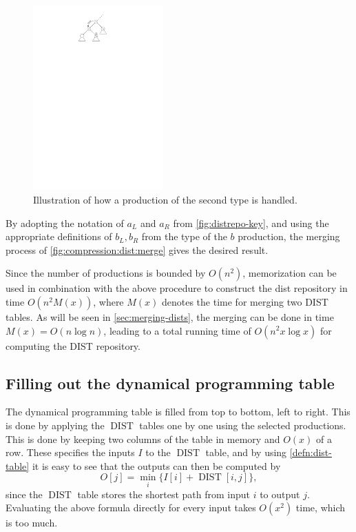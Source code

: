 \documentclass[twoside,11pt,openright]{report}
\newcommand{\DIST}{\operatorname{DIST}}
\begin{document}
\begin{description}
  \begin{figure}[h!]
    \centering
    \includegraphics[width=5cm]{images/distrepo-2nd}
    \caption{Illustration of how a production of the second type is handled.}
    \label{fig:distrepo-2nd}
  \end{figure}

  By adopting the notation of $a_L$ and $a_R$ from \cref{fig:distrepo-key}, and using the appropriate definitions of $b_L, b_R$ from the type of the $b$ production, the merging process of \cref{fig:compression:dist:merge} gives the desired result.
\end{description}
Since the number of productions is bounded by $O(n^2)$, memorization can be used in combination with the above procedure to construct the dist repository in time $O(n^2 M(x))$, where $M(x)$ denotes the time for merging two DIST tables. As will be seen in \cref{sec:merging-dists}, the merging can be done in time $M(x) = O(n\log{n})$, leading to a total running time of $O(n^2x\log{x})$ for computing the DIST repository.

\subsection{Filling out the dynamical programming table}
\label{sec:algorithm:filling-grid-overview}
The dynamical programming table is filled from top to bottom, left to right. This is done by applying the $\DIST$ tables one by one using the selected productions. This is done by keeping two columns of the table in memory and $O(x)$ of a row. These specifies the inputs $I$ to the $\DIST$ table, and by using \cref{defn:dist-table} it is easy to see that the outputs can then be computed by
\begin{equation}
  \label{eqn:dist-application}
  O[j] = \min_i \{ I[i] + \DIST[i, j] \},
\end{equation}
since the $\DIST$ table stores the shortest path from input $i$ to output $j$. Evaluating the above formula directly for every input takes $O(x^2)$ time, which is too much.
\end{document}
